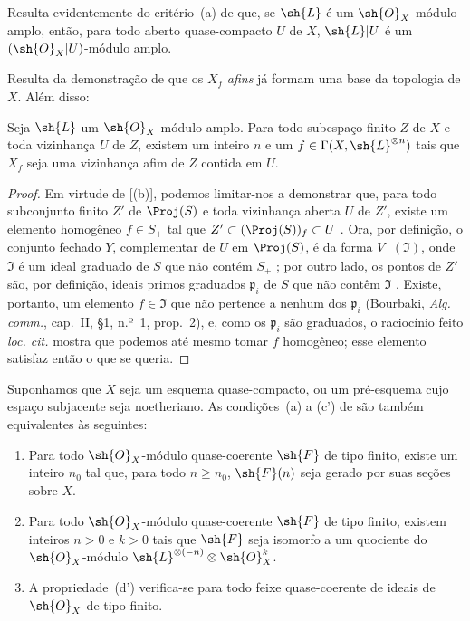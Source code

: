 \documentclass[oneside,10pt]{amsart}
\renewcommand{\geq}{\geqslant}
\newcommand{\oldpage}[2][]{\marginnote{\normalfont\footnotesize\textbf{#1}~|~#2}\ignorespaces}
\let\EGAOriginalLabel\label
\renewcommand{\label}[1]{\phantomsection\EGAOriginalLabel{#1}}
\begin{document}
Resulta evidentemente do critério~(a) de  que, se $\sh{L}$ é um $\sh{O}_X$-módulo amplo, então, para todo aberto quase-compacto $U$ de $X$, $\sh{L}|U$ é um $(\sh{O}_X|U)$-módulo amplo.

Resulta da demonstração de  que os $X_f$ \emph{afins} já formam uma base da topologia de $X$.
Além disso:

\begin{corollary}[4.5.4]
\label{II.4.5.4}
Seja $\sh{L}$ um $\sh{O}_X$-módulo amplo.
Para todo subespaço finito $Z$ de $X$ e toda vizinhança $U$ de $Z$, existem um inteiro $n$ e um $f\in\Gamma(X,\sh{L}^{\otimes n})$ tais que $X_f$ seja uma vizinhança afim de $Z$ contida em $U$.
\end{corollary}

\begin{proof}
\oldpage[II]{85}
Em virtude de [(b)], podemos limitar-nos a demonstrar que, para todo subconjunto finito $Z'$ de $\Proj(S)$ e toda vizinhança aberta $U$ de $Z'$, existe um elemento homogêneo $f\in S_+$ tal que $Z'\subset(\Proj(S))_f\subset U$ .
Ora, por definição, o conjunto fechado $Y$, complementar de $U$ em $\Proj(S)$, é da forma $V_+(\mathfrak{I})$, onde $\mathfrak{I}$ é um ideal graduado de $S$ que não contém $S_+$ ;
por outro lado, os pontos de $Z'$ são, por definição, ideais primos graduados $\mathfrak{p}_i$ de $S$ que não contêm $\mathfrak{I}$ .
Existe, portanto, um elemento $f\in\mathfrak{I}$ que não pertence a nenhum dos $\mathfrak{p}_i$ (Bourbaki, \emph{Alg. comm.}, cap.~II, \S1, n.º~1, prop.~2), e, como os $\mathfrak{p}_i$ são graduados, o raciocínio feito \emph{loc. cit.} mostra que podemos até mesmo tomar $f$ homogêneo;
esse elemento satisfaz então o que se queria.
\end{proof}

\begin{proposition}[4.5.5]
\label{II.4.5.5}
Suponhamos que $X$ seja um esquema quase-compacto, ou um pré-esquema cujo espaço subjacente seja noetheriano.
As condições~(a) a (c') de  são também equivalentes às seguintes:
\begin{enumerate}
  \item[\rm{(d)}] Para todo $\sh{O}_X$-módulo quase-coerente $\sh{F}$ de tipo finito, existe um inteiro $n_0$ tal que, para todo $n\geq n_0$, $\sh{F}(n)$ seja gerado por suas seções sobre $X$.
  \item[\rm{(d')}] Para todo $\sh{O}_X$-módulo quase-coerente $\sh{F}$ de tipo finito, existem inteiros $n>0$ e $k>0$ tais que $\sh{F}$ seja isomorfo a um quociente do $\sh{O}_X$-módulo $\sh{L}^{\otimes(-n)}\otimes\sh{O}_X^k$.
  \item[\rm{(d'')}] A propriedade~(d') verifica-se para todo feixe quase-coerente de ideais de $\sh{O}_X$ de tipo finito.
\end{enumerate}
\end{proposition}
\end{document}
